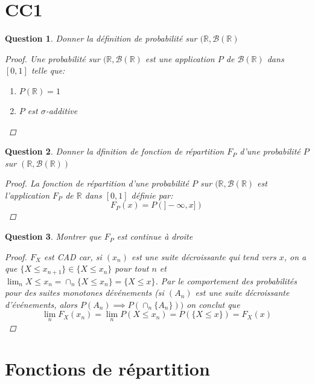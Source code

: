 \documentclass{article}
\theoremstyle{plain}
\newtheorem{question}{Question}
\begin{document}
\section{CC1}
\begin{question}
	Donner la définition de probabilité sur $(\mathbb{R}, \mathscr{B} (\mathbb{R})$
	\begin{proof}
		Une probabilité sur $(\mathbb{R}, \mathscr{B} (\mathbb{R})$ est une application $P$ de $\mathscr{B} (\mathbb{R})$ dans $[0,1]$ telle que:
		\begin{enumerate}
			\item $P(\mathbb{R}) = 1$
			\item $P$ est $\sigma$-additive
		\end{enumerate}
	\end{proof}
\end{question}

\begin{question}
	Donner la dfinition de fonction de répartition $F_P$ d'une probabilité $P$ sur $(\mathbb{R}, \mathscr{B} (\mathbb{R}))$

	\begin{proof}
		La fonction de répartition d'une probabilité $P$ sur $(\mathbb{R}, \mathscr{B} (\mathbb{R})$ est l'application $F_P$ de $\mathbb{R}$ dans $[0,1]$ définie par:
		\begin{equation*}
			F_P(x) = P(]-\infty, x])
		\end{equation*}
	\end{proof}
\end{question}

\begin{question}
	Montrer que $F_P$ est continue à droite
	\begin{proof}
		$F_X$ est CAD car, si $(x_n)$ est une suite décroissante qui tend vers $x$, on a que $\{X \leq
			x_{n+1}\} \in \{X \leq x_n\}$ pour tout $n$ et $\lim_n{X \leq x_n} = \cap_n{\{X \leq x_n\}} = \{{X \leq x\}}$.
		Par le comportement des probabilités pour des suites monotones dévénements
		(si $(A_n)$ est une suite décroissante d’événements, alors $P (A_n) \implies P (\cap_n{\{A_n\}}))$
		on conclut que
		\begin{equation*}
			\lim_n F_X (x_n) = \lim_n{ P (X \leq x_n)} = P (\{X \leq x\}) = F_X (x)
		\end{equation*}
	\end{proof}
\end{question}

\section{Fonctions de répartition}
\end{document}
